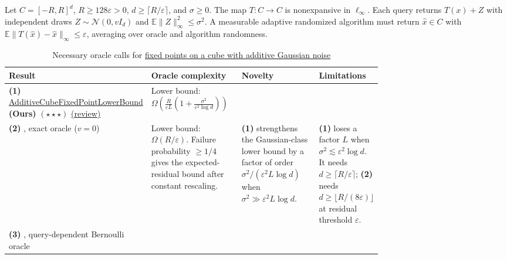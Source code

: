 \begin{table}[tp]
\centering
\caption{Necessary oracle calls for \href{https://github.com/k3nfalt/longtails/blob/main/LongTails/Setups/GaussianAdditiveCubeFixedPoint.lean}{fixed points on a cube with additive Gaussian noise}}\label{tab:GaussianAdditiveCubeFixedPoint}
\parbox{\linewidth}{\footnotesize Let $C=[-R,R]^d$, $R\ge128\varepsilon>0$, $d\ge\lceil R/\varepsilon\rceil$, and $\sigma\ge0$. The map $T:C\to C$ is nonexpansive in $\ell_\infty$. Each query returns $T(x)+Z$ with independent draws $Z\sim\mathcal N(0,vI_d)$ and $\mathbb E\|Z\|_\infty^2\le\sigma^2$. A measurable adaptive randomized algorithm must return $\hat x\in C$ with $\mathbb E\|T(\hat x)-\hat x\|_\infty\le\varepsilon$, averaging over oracle and algorithm randomness.}\par\smallskip
\begin{threeparttable}
\footnotesize
\setlength{\tabcolsep}{4pt}\renewcommand{\arraystretch}{1.25}
\begin{tabularx}{\linewidth}{@{}>{\raggedright\arraybackslash}p{0.21\linewidth}>{\raggedright\arraybackslash}p{0.27\linewidth}>{\raggedright\arraybackslash}p{0.26\linewidth}>{\raggedright\arraybackslash}X@{}}
\toprule
\textbf{Result} & \textbf{Oracle complexity} & \textbf{Novelty} & \textbf{Limitations} \\
\midrule
\textbf{(1)} \href{https://github.com/k3nfalt/longtails/blob/main/LongTails/Theorems/AdditiveCubeFixedPointLowerBound.lean}{Additive\allowbreak Cube\allowbreak Fixed\allowbreak Point\allowbreak Lower\allowbreak Bound} \textbf{(Ours)} $(\star\star\star)$ \href{https://github.com/k3nfalt/longtails/blob/main/scripts/reviews/AdditiveCubeFixedPointLowerBound.md}{(review)}
& Lower bound: $\displaystyle\Omega\!\left(\frac{R}{\varepsilon L}\left(1+\frac{\sigma^2}{\varepsilon^2\log d}\right)\right)$ & & \\
\midrule[1.2pt]
\textbf{(2)} \citep[Thm.~11]{psDgm2026v1}, exact oracle ($v=0$)
& Lower bound: $\Omega(R/\varepsilon)$. Failure probability $\ge1/4$ gives the expected-residual bound after constant rescaling.
& \textbf{(1)} strengthens the Gaussian-class lower bound by a factor of order $\sigma^2/(\varepsilon^2 L\log d)$ when $\sigma^2\gg\varepsilon^2 L\log d$.
& \textbf{(1)} loses a factor $L$ when $\sigma^2\lesssim\varepsilon^2\log d$. It needs $d\ge\lceil R/\varepsilon\rceil$; \textbf{(2)} needs $d\ge\lfloor R/(8\varepsilon)\rfloor$ at residual threshold $\varepsilon$. \\
\midrule
\textbf{(3)} \citep[Thm.~13, Rem.~14]{psDgm2026v1}, query-dependent Bernoulli oracle

\end{tabularx}
\end{threeparttable}
\end{table}
